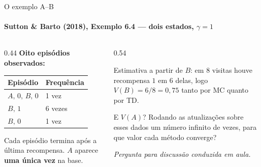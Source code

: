 \documentclass[aspectratio=169, 11pt]{beamer}
\newcommand{\paradiscussao}{\smallskip
  {\footnotesize\color{rlCinza}\itshape Pergunta para discussão conduzida em aula.}}
\begin{document}
\begin{frame}{O exemplo A--B}
  \framesubtitle{Sutton \& Barto (2018), Exemplo 6.4 — dois estados, $\gamma = 1$}

  \begin{columns}[T]
    \begin{column}{0.44\textwidth}
      \textbf{Oito episódios observados:}
      \smallskip

      {\small
      \begin{tabular}{ll}
        \toprule
        Episódio & Frequência \\
        \midrule
        $A,\,0,\,B,\,0$ & 1 vez \\
        $B,\,1$         & 6 vezes \\
        $B,\,0$         & 1 vez \\
        \bottomrule
      \end{tabular}}

      \medskip
      {\small Cada episódio termina após a última recompensa. $A$ aparece
      \textbf{uma única vez} na base.}
    \end{column}
    \begin{column}{0.54\textwidth}
      \begin{defbox}{}
        Estimativa a partir de $B$: em $8$ visitas houve recompensa $1$ em
        $6$ delas, logo $V(B) = 6/8 = 0{,}75$ tanto por MC quanto por TD.
      \end{defbox}

      \begin{quizbox}{}
        E $V(A)$? Rodando as atualizações sobre esses dados um número
        infinito de vezes, para que valor cada método converge?
      \end{quizbox}
      \paradiscussao
    \end{column}
  \end{columns}
\end{frame}
\end{document}
